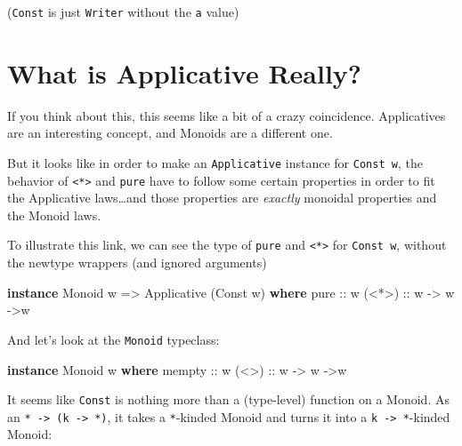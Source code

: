 \documentclass[]{article}
\newenvironment{Shaded}{}{}
\newcommand{\DataTypeTok}[1]{\textcolor[rgb]{0.56,0.13,0.00}{#1}}
\newcommand{\KeywordTok}[1]{\textcolor[rgb]{0.00,0.44,0.13}{\textbf{#1}}}
\newcommand{\NormalTok}[1]{#1}
\newcommand{\OtherTok}[1]{\textcolor[rgb]{0.00,0.44,0.13}{#1}}
\begin{document}
(\texttt{Const} is just \texttt{Writer} without the \texttt{a} value)

\hypertarget{what-is-applicative-really}{%
\section{What is Applicative Really?}\label{what-is-applicative-really}}

If you think about this, this seems like a bit of a crazy coincidence.
Applicatives are an interesting concept, and Monoids are a different one.

But it looks like in order to make an \texttt{Applicative} instance for
\texttt{Const\ w}, the behavior of \texttt{\textless{}*\textgreater{}} and
\texttt{pure} have to follow some certain properties in order to fit the
Applicative laws\ldots{}and those properties are \emph{exactly} monoidal
properties and the Monoid laws.

To illustrate this link, we can see the type of \texttt{pure} and
\texttt{\textless{}*\textgreater{}} for \texttt{Const\ w}, without the newtype
wrappers (and ignored arguments)

\begin{Shaded}
\begin{Highlighting}[]
\KeywordTok{instance} \DataTypeTok{Monoid}\NormalTok{ w }\OtherTok{=>} \DataTypeTok{Applicative}\NormalTok{ (}\DataTypeTok{Const}\NormalTok{ w) }\KeywordTok{where}
\OtherTok{    pure  ::}\NormalTok{ w}
\OtherTok{    (<*>) ::}\NormalTok{ w }\OtherTok{->}\NormalTok{ w }\OtherTok{->}\NormalTok{w}
\end{Highlighting}
\end{Shaded}

And let's look at the \texttt{Monoid} typeclass:

\begin{Shaded}
\begin{Highlighting}[]
\KeywordTok{instance} \DataTypeTok{Monoid}\NormalTok{ w }\KeywordTok{where}
\OtherTok{    mempty ::}\NormalTok{ w}
\OtherTok{    (<>)   ::}\NormalTok{ w }\OtherTok{->}\NormalTok{ w }\OtherTok{->}\NormalTok{w}
\end{Highlighting}
\end{Shaded}

It seems like \texttt{Const} is nothing more than a (type-level) function on a
Monoid. As an \texttt{*\ -\textgreater{}\ (k\ -\textgreater{}\ *)}, it takes a
\texttt{*}-kinded Monoid and turns it into a
\texttt{k\ -\textgreater{}\ *}-kinded Monoid:
\end{document}
